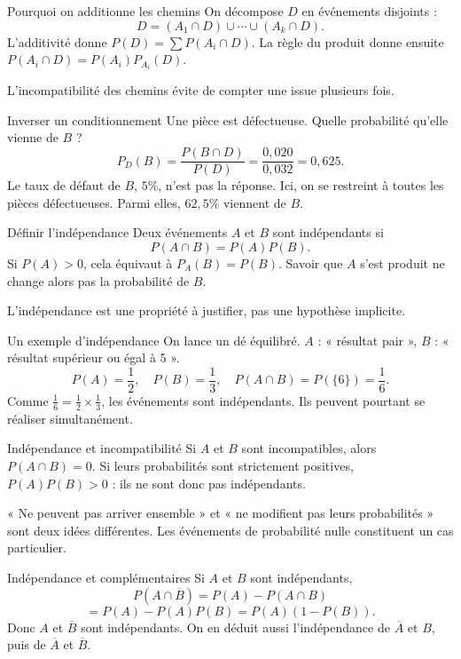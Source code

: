 \documentclass[aspectratio=169,12pt]{beamer}
\begin{document}
\renewcommand{\slidekind}{JUSTIFIER}
\begin{frame}[t,fragile]{Pourquoi on additionne les chemins}
On décompose $D$ en événements disjoints :\[D=(A_1\cap D)\cup\cdots\cup(A_k\cap D).\]L’additivité donne $P(D)=\sum P(A_i\cap D)$. La règle du produit donne ensuite $P(A_i\cap D)=P(A_i)P_{A_i}(D)$.\medskip\par L’incompatibilité des chemins évite de compter une issue plusieurs fois.
\end{frame}
\renewcommand{\slidekind}{COMPRENDRE}
\begin{frame}[t,fragile]{Inverser un conditionnement}
Une pièce est défectueuse. Quelle probabilité qu’elle vienne de $B$ ?\[P_D(B)=\frac{P(B\cap D)}{P(D)}=\frac{0,020}{0,032}=0,625.\]Le taux de défaut de $B$, $5\%$, n’est pas la réponse. Ici, on se restreint à toutes les pièces défectueuses. Parmi elles, $62,5\%$ viennent de $B$.
\end{frame}
\renewcommand{\slidekind}{COMPRENDRE}
\begin{frame}[t,fragile]{Définir l’indépendance}
Deux événements $A$ et $B$ sont indépendants si\[\boxed{P(A\cap B)=P(A)P(B)}.\]Si $P(A)>0$, cela équivaut à $P_A(B)=P(B)$. Savoir que $A$ s’est produit ne change alors pas la probabilité de $B$.\medskip\par L’indépendance est une propriété à justifier, pas une hypothèse implicite.
\end{frame}
\renewcommand{\slidekind}{MÉTHODE \& EXEMPLE}
\begin{frame}[t,fragile]{Un exemple d’indépendance}
On lance un dé équilibré. $A$ : « résultat pair », $B$ : « résultat supérieur ou égal à 5 ».\[P(A)=\frac12,\quad P(B)=\frac13,\quad P(A\cap B)=P(\{6\})=\frac16.\]Comme $\frac16=\frac12\times\frac13$, les événements sont indépendants. Ils peuvent pourtant se réaliser simultanément.
\end{frame}
\renewcommand{\slidekind}{COMPRENDRE}
\begin{frame}[t,fragile]{Indépendance et incompatibilité}
Si $A$ et $B$ sont incompatibles, alors $P(A\cap B)=0$. Si leurs probabilités sont strictement positives, $P(A)P(B)>0$ : ils ne sont donc pas indépendants.\medskip\par « Ne peuvent pas arriver ensemble » et « ne modifient pas leurs probabilités » sont deux idées différentes. Les événements de probabilité nulle constituent un cas particulier.
\end{frame}
\renewcommand{\slidekind}{COMPRENDRE}
\begin{frame}[t,fragile]{Indépendance et complémentaires}
Si $A$ et $B$ sont indépendants,\[P(A\cap\overline B)=P(A)-P(A\cap B)\]\[=P(A)-P(A)P(B)=P(A)(1-P(B)).\]Donc $A$ et $\overline B$ sont indépendants. On en déduit aussi l’indépendance de $\overline A$ et $B$, puis de $\overline A$ et $\overline B$.
\end{frame}
\end{document}
